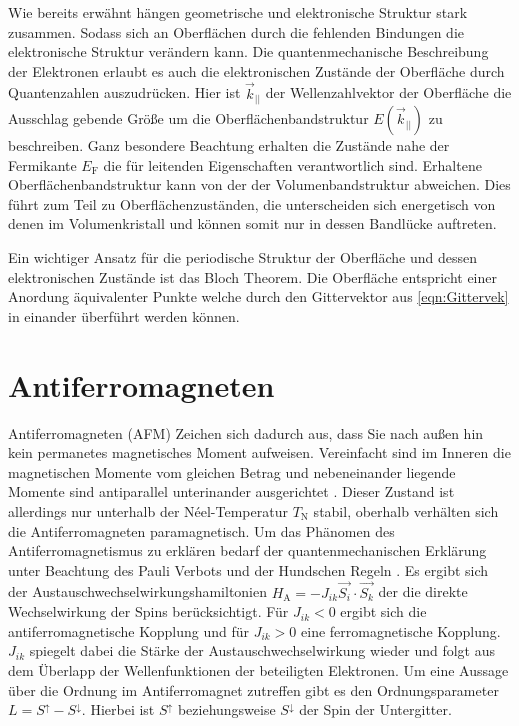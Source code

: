         Wie bereits erwähnt hängen geometrische und elektronische Struktur stark zusammen.
        Sodass sich an Oberflächen durch die fehlenden Bindungen die elektronische Struktur verändern kann.
        Die quantenmechanische Beschreibung der Elektronen erlaubt es auch die elektronischen Zustände der Oberfläche durch Quantenzahlen auszudrücken.
        Hier ist $\vec{k}_{||}$ der Wellenzahlvektor der Oberfläche die Ausschlag gebende Größe um die Oberflächenbandstruktur $E(\vec{k}_{||})$ zu beschreiben.
        Ganz besondere Beachtung erhalten die Zustände nahe der Fermikante $E_\text{F}$ die für leitenden Eigenschaften verantwortlich sind.
        Erhaltene Oberflächenbandstruktur kann von der der Volumenbandstruktur abweichen.
        Dies führt zum Teil zu Oberflächenzuständen, die unterscheiden sich energetisch von denen im Volumenkristall und können somit nur in dessen Bandlücke auftreten.

        Ein wichtiger Ansatz für die periodische Struktur der Oberfläche und dessen elektronischen Zustände ist das Bloch Theorem.
        Die Oberfläche entspricht einer Anordung äquivalenter Punkte welche durch den Gittervektor aus \autoref{eqn:Gittervek} in einander überführt werden können.


    \section{Antiferromagneten}
        Antiferromagneten (AFM) Zeichen sich dadurch aus, dass Sie nach außen hin kein permanetes magnetisches Moment aufweisen.
        Vereinfacht sind im Inneren die magnetischen Momente vom gleichen Betrag und nebeneinander liegende Momente sind antiparallel unterinander ausgerichtet \cite{Suter}.
        Dieser Zustand ist allerdings nur unterhalb der Néel-Temperatur $T_\text{N}$ stabil, oberhalb verhälten sich die Antiferromagneten paramagnetisch.
        Um das Phänomen des Antiferromagnetismus zu erklären bedarf der quantenmechanischen Erklärung unter Beachtung des Pauli Verbots und der Hundschen Regeln \cite{TUChemnitz}.
        Es ergibt sich der Austauschwechselwirkungshamiltonien $H_\text{A} = - J_{ik} \vec{S_i}\cdot\vec{S_k}$ der die direkte Wechselwirkung der Spins berücksichtigt.
        Für $J_{ik} < 0$ ergibt sich die antiferromagnetische Kopplung und für $J_{ik} > 0$ eine ferromagnetische Kopplung.
        $J_{ik}$ spiegelt dabei die Stärke der Austauschwechselwirkung wieder und folgt aus dem Überlapp der Wellenfunktionen der beteiligten Elektronen.
        Um eine Aussage über die Ordnung im Antiferromagnet zutreffen gibt es den Ordnungsparameter $L = S^{\uparrow} - S^{\downarrow}$.
        Hierbei ist $S^{\uparrow}$ beziehungsweise $S^{\downarrow}$ der Spin der Untergitter.

